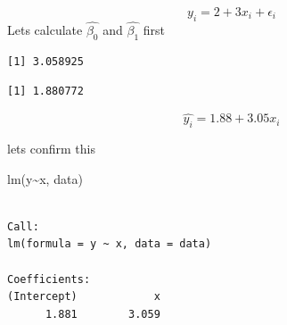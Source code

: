 \documentclass[
  letterpaper,
  DIV=11,
  numbers=noendperiod]{scrreprt}
\newenvironment{Shaded}{\begin{snugshade}}{\end{snugshade}}
\newcommand{\DecValTok}[1]{\textcolor[rgb]{0.68,0.00,0.00}{#1}}
\newcommand{\FunctionTok}[1]{\textcolor[rgb]{0.28,0.35,0.67}{#1}}
\newcommand{\NormalTok}[1]{\textcolor[rgb]{0.00,0.23,0.31}{#1}}
\newcommand{\OtherTok}[1]{\textcolor[rgb]{0.00,0.23,0.31}{#1}}
\newcommand{\SpecialCharTok}[1]{\textcolor[rgb]{0.37,0.37,0.37}{#1}}
\begin{document}
\[
y_i = 2 + 3 x_i + \epsilon_i
\] Lets calculate \(\hat{\beta_0}\) and \(\hat{\beta_1}\) first

\begin{Shaded}
\end{Shaded}

\begin{verbatim}
[1] 3.058925
\end{verbatim}

\begin{Shaded}
\end{Shaded}

\begin{verbatim}
[1] 1.880772
\end{verbatim}

\[
\hat{y_i} = 1.88 + 3.05 x_i
\]

lets confirm this

\begin{Shaded}
\begin{Highlighting}[]
\FunctionTok{lm}\NormalTok{(y}\SpecialCharTok{\textasciitilde{}}\NormalTok{x, data)}
\end{Highlighting}
\end{Shaded}

\begin{verbatim}

Call:
lm(formula = y ~ x, data = data)

Coefficients:
(Intercept)            x  
      1.881        3.059  
\end{verbatim}
\end{document}
